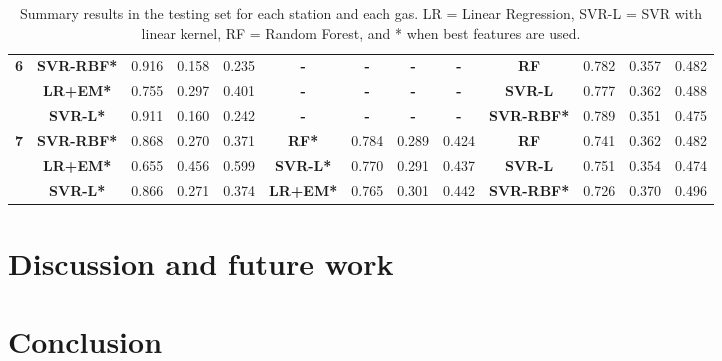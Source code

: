 \begin{table*}
{\begin{tabular}{|c|c|c|c|c|c|c|c|c|c|c|c|c|}
\multirow{3}{*}{\textbf{6}} & \textbf{SVR-RBF*} & 0.916          & 0.158        & 0.235         & \textbf{-}      & \textbf{-}     & \textbf{-}   & \textbf{-}    & \textbf{RF}      & 0.782                              & 0.357                            & 0.482                             \\
            & \textbf{LR+EM*}   & 0.755          & 0.297        & 0.401         & \textbf{-}      & \textbf{-}     & \textbf{-}   & \textbf{-}    & \textbf{SVR-L}   & 0.777                              & 0.362                            & 0.488                             \\
            & \textbf{SVR-L*}   & 0.911          & 0.160        & 0.242         & \textbf{-}      & \textbf{-}     & \textbf{-}   & \textbf{-}    & \textbf{SVR-RBF*} & 0.789                              & 0.351                            & 0.475                             \\\hline
\multirow{3}{*}{\textbf{7}} & \textbf{SVR-RBF*} & 0.868          & 0.270        & 0.371         & \textbf{RF*}    & 0.784          & 0.289        & 0.424         & \textbf{RF}      & 0.741                              & 0.362                            & 0.482                             \\
            & \textbf{LR+EM*}   & 0.655          & 0.456        & 0.599         & \textbf{SVR-L*} & 0.770          & 0.291        & 0.437         & \textbf{SVR-L}   & 0.751                              & 0.354                            & 0.474                             \\
            & \textbf{SVR-L*}   & 0.866          & 0.271        & 0.374
            & \textbf{LR+EM*} & 0.765          & 0.301        & 0.442
            & \textbf{SVR-RBF*} & 0.726                              & 0.370
            & 0.496 \\\hline
\end{tabular}
    }
    \caption{Summary results in the testing set for each station and each gas. LR = Linear Regression, SVR-L = SVR with linear kernel, RF = Random Forest, and * when best features are used.}
    \label{tab:summary-results}
\end{table*}

\section{Discussion and future work}
\label{sec:discussion}


\section{Conclusion}
\label{sec:conclusion}
